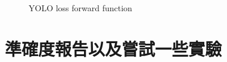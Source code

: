\documentclass[a4paper,12pt]{article}   %
\begin{document}
\begin{figure}[htb]
  \vspace{0.1\baselineskip}  
  \centering  
    \caption{YOLO loss forward function}
    \label{fig:code}
  \vspace{0.1\baselineskip}
\end{figure}

\section{準確度報告以及嘗試一些實驗}
\end{document}
